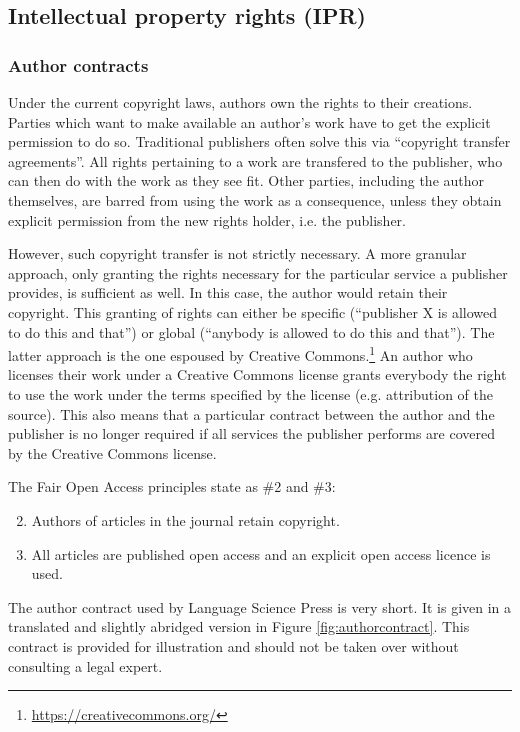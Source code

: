 \documentclass[guidelines,nonflat,modfonts] {langsci/langscibook}
\newcommand{\footurl}[1]{\footnote{\url{#1}}}
\begin{document}
\subsection{Intellectual property rights (IPR)}
\subsubsection{Author contracts}\label{sec:authorcontracts}
Under the current copyright laws, authors own the rights to their creations. Parties which want to make available an author's work have to get the explicit permission to do so. Traditional publishers often solve this via ``copyright transfer agreements''. All rights pertaining to a work are transfered to the publisher, who can then do with the work as they see fit. Other parties, including the author themselves, are barred from using the work as a consequence, unless they obtain explicit permission from the new rights holder, i.e. the publisher. 

However, such copyright transfer is not strictly necessary. A more granular approach, only granting the rights necessary for the particular service a publisher provides, is sufficient as well. In this case, the author would retain their copyright. This granting of rights can either be specific (``publisher X is allowed to do this and that'') or global (``anybody is allowed to do this and that''). The latter approach is the one espoused by Creative Commons.\footurl{https://creativecommons.org/} An author who licenses their work under a Creative Commons license grants everybody the right to use the work under the terms specified by the license (e.g. attribution of the source). This also means that a particular contract between the author and the publisher is no longer required if all services the publisher performs are covered by the Creative Commons license. 

The Fair Open Access principles state as \#2 and \#3:

\begin{enumerate}
\setcounter{enumi}{1}
\item Authors of articles in the journal retain copyright.
\item All articles are published open access and an explicit open access licence is used.
\end{enumerate}

\noindent The author contract used by Language Science Press is very short. It is given in a translated and slightly abridged version in Figure \ref{fig:authorcontract}. This contract is provided for illustration and should not be taken over without consulting a legal expert.
\end{document}

